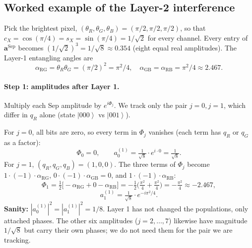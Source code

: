 \documentclass[11pt]{article}
\newcommand{\ket}[1]{\left| #1 \right\rangle}
\begin{document}
\subsection{Worked example of the Layer-2 interference}

Pick the brightest pixel, $(\theta_R, \theta_G, \theta_B) = (\pi/2, \pi/2, \pi/2)$, so that $c_X = \cos(\pi/4) = s_X = \sin(\pi/4) = 1/\sqrt{2}$ for every channel. Every entry of $\mathbf{a}^\text{Sep}$ becomes $(1/\sqrt{2})^3 = 1/\sqrt{8} \approx 0.354$ (eight equal real amplitudes). The Layer-1 entangling angles are
\[
\alpha_\text{RG} = \theta_R \theta_G = (\pi/2)^2 = \pi^2/4, \quad \alpha_\text{GB} = \alpha_\text{RB} = \pi^2/4 \approx 2.467.
\]

\paragraph{Step 1: amplitudes after Layer 1.} Multiply each Sep amplitude by $e^{i\Phi_j}$. We track only the pair $j=0, j=1$, which differ in $q_R$ alone (state $\ket{000}$ vs $\ket{001}$).

For $j=0$, all bits are zero, so every term in $\Phi_j$ vanishes (each term has $q_R$ or $q_G$ as a factor):
\[
\Phi_0 = 0, \qquad a^{(1)}_0 = \tfrac{1}{\sqrt{8}} \cdot e^{i \cdot 0} = \tfrac{1}{\sqrt{8}}.
\]
For $j=1$, $(q_R, q_G, q_B) = (1, 0, 0)$. The three terms of $\Phi_j$ become $1 \cdot (-1) \cdot \alpha_\text{RG}$, $0 \cdot (-1) \cdot \alpha_\text{GB} = 0$, and $1 \cdot (-1) \cdot \alpha_\text{RB}$:
\[
\Phi_1 = \tfrac{1}{2}\bigl[-\alpha_\text{RG} + 0 - \alpha_\text{RB}\bigr] = -\tfrac{1}{2}\bigl(\tfrac{\pi^2}{4} + \tfrac{\pi^2}{4}\bigr) = -\tfrac{\pi^2}{4} \approx -2.467,
\]
\[
a^{(1)}_1 = \tfrac{1}{\sqrt{8}} \cdot e^{-i\pi^2/4}.
\]
\textbf{Sanity:} $|a^{(1)}_0|^2 = |a^{(1)}_1|^2 = 1/8$. Layer 1 has not changed the populations, only attached phases. The other six amplitudes ($j=2,\ldots,7$) likewise have magnitude $1/\sqrt{8}$ but carry their own phases; we do not need them for the pair we are tracking.
\end{document}
